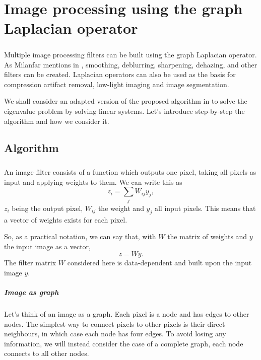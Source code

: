 \chapter{Image processing using the graph Laplacian operator}

\paragraph{}
Multiple image processing filters can be built using the graph Laplacian operator.
As Milanfar mentions in \cite{siam_slides_2016}, smoothing, deblurring, sharpening, dehazing, and other filters can be created.
Laplacian operators can also be used as the basis for compression artifact removal, low-light imaging and image segmentation.

We shall consider an adapted version of the proposed algorithm in \cite{glide_2014} to solve the eigenvalue problem by solving linear systems.
Let's introduce step-by-step the algorithm and how we consider it.

\section{Algorithm}

\paragraph{}
An image filter consists of a function which outputs one pixel, taking all pixels as input and applying weights to them. We can write this as
\[z_i = \sum_j W_{ij}y_j,\]
\(z_i\) being the output pixel, \(W_{ij}\) the weight and \(y_j\) all input pixels.
This means that a vector of weights exists for each pixel.

So, as a practical notation, we can say that, with \(W\) the matrix of weights and \(y\) the input image as a vector,
\[z = Wy.\]
The filter matrix \(W\) considered here is data-dependent and built upon the input image \(y\).

\paragraph{Image as graph}
Let's think of an image as a graph.
Each pixel is a node and has edges to other nodes.
The simplest way to connect pixels to other pixels is their direct neighbours, in which case each node has four edges.
To avoid losing any information, we will instead consider the case of a complete graph, each node connects to all other nodes.

